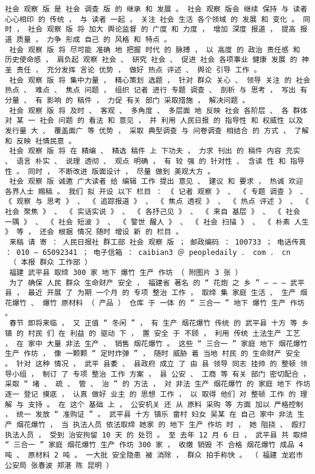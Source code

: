\documentclass{article}
\begin{document}
\begin{Verbatim}[commandchars=\\\{\}]
 社会 观察 版 是 社会 调查 版 的 继承 和 发展 。 社会 观察 版会 继续 保持 与 读者 心心相印 的 传统 ， 与 读者 一起 ， 关注 社会 生活 各个领域 的 发展 和 变化 。 同时 ， 社会 观察 版 将 加大 舆论监督 的 广度 和 力度 ， 增加 深度 报道 ， 提高 报道 质量 ， 力争 形成 自己 的 风格 和 特点 。 
 社会 观察 版 将 尽可能 准确 地 把握 时代 的 脉搏 ， 以 高度 的 政治 责任感 和 历史使命感 ， 肩负起 观察 社会 、 研究 社会 、 促进 社会 各项事业 健康 发展 的 神圣 责任 ， 充分发挥 言论 优势 ， 做好 热点 评述 、 舆论 引导 工作 。 
 社会 观察 版 将 集中力量 ， 精心策划 选题 ， 针对 群众 关心 、 领导 关注 的 社会 热点 、 难点 、 焦点 问题 ， 组织 记者 进行 专题 调查 、 剖析 与 思考 ， 写出 有 分量 、 有 影响 的 稿件 ， 力促 有关 部门 采取措施 ， 解决问题 。 
 社会 观察 版 将 及时 、 客观 、 多角度 、 多层面 地 反映 社会 各阶层 、 各 群体 对 某 一 社会 问题 的 看法 和 意见 ， 并 利用 人民日报 的 指导性 和 权威性 以及 发行量 大 、 覆盖面广 等 优势 ， 采取 典型调查 与 问卷调查 相结合 的 方式 ， 了解 和 反映 社情民意 。 
 社会 观察 版 将 在 精编 、 精选 稿件 上 下功夫 ， 力求 刊出 的 稿件 内容 充实 、 语言 朴实 、 说理 透彻 、 观点 明确 ， 有 较 强 的 针对性 、 含读 性 和 指导性 。 同时 ， 不断改进 版面设计 ， 尽量 做到 美观大方 。 
 社会 观察 版 诚邀 广大读者 给 编辑 工作 提出 意见 、 建议 和 要求 ， 热诚 欢迎 各界人士 赐稿 。 我们 拟 开设 以下 栏目 ： 《 记者 观察 》 、 《 专题 调查 》 、 《 观察 与 思考 》 、 《 追踪报道 》 、 《 焦点 透视 》 、 《 热点 评述 》 、 《 社会 聚焦 》 、 《 实话实说 》 、 《 各抒己见 》 、 《 来自 基层 》 、 《 社会 一隅 》 、 《 社会 短波 》 、 《 警世 醒人 》 、 《 社会 扫描 》 、 《 朴素 人生 》 等 ， 还会 根据 情况 随时 增设 新 的 栏目 。 
 来稿 请 寄 ： 人民日报社 群工部 社会 观察 版 ； 邮政编码 ： 100733 ； 电话传真 ： 010 — 65092341 ； 电子信箱 ： caibian3 ＠ peopledaily ． com ． cn 
 （ 本报 群众 工作部 ） 
 福建 武平县 取缔 300 家 地下 爆竹 生产 作坊 （ 附图片 3 张 ） 
 为了 确保 人民 群众 生命财产 安全 ， 福建省 著名 的 “ 花炮 之 乡 ” — — — 武平县 ， 最近 开展 了 为期 一个月 的 专项 整治 工作 ， 取缔 集 家庭 生活 、 生产 烟花爆竹 、 爆竹 原材料 （ 产品 ） 仓库 于 一体 的 “ 三合一 ” 地下 爆竹 生产 作坊 。 
 春节 即将来临 ， 又 正值 “ 冬闲 ” ， 有 生产 烟花爆竹 传统 的 武平县 十方 等 乡镇 的 村民 们 在 利益 的 驱动 下 ， 置 安全 于 不顾 ， 利用 传统 土法生产 工艺 ， 在 家中 大量 非法 生产 、 销售 烟花爆竹 。 这些 “ 三合一 ” 家庭 地下 烟花爆竹 生产 作坊 ， 像 一颗颗 “ 定时炸弹 ” ， 随时 威胁 着 当地 村民 的 生命财产 安全 。 针对 这种 情况 ， 武平 县委 、 县政府 成立 了 由 县 领导 同志 挂帅 的 整顿 领导小组 ， 制订 了 专项 整治 工作 方案 ， 县 公安 、 工商 等 有关 部门 密切配合 ， 采取 “ 堵 、 疏 、 管 、 治 ” 的 方法 ， 对 非法 生产 烟花爆竹 的 家庭 地下 作坊 逐一 登记 摸底 ， 认真 做好 业主 的 思想 工作 ， 以 取得 他们 对 整顿 工作 的 理解 与 支持 。 在 这个 基础 上 ， 公安机关 还 从 原料 采购 等 方面 加以 严格控制 ， 统一 发放 “ 准购证 ” 。 武平县 十方 镇乐 畲村 妇女 吴某 在 自己 家中 非法 生产 烟花爆竹 ， 当 执法人员 依法取缔 她家 的 地下 生产 作坊 时 ， 她 阻挠 、 殴打 执法人员 ， 受到 治安拘留 10 天 的 处罚 。 至 去年 12 月 6 日 ， 武平县 共 取缔 “ 三合一 ” 家庭 烟花爆竹 生产 作坊 300 家 ， 收缴 销毁 不 合格 烟花爆竹 成品 4 吨 、 原材料 2 吨 。 一大批 安全隐患 被 消除 ， 群众 拍手称快 。 （ 福建 龙岩市 公安局 张春波 郑湛 陈 昆明 ） 

\end{Verbatim}
\end{document}
